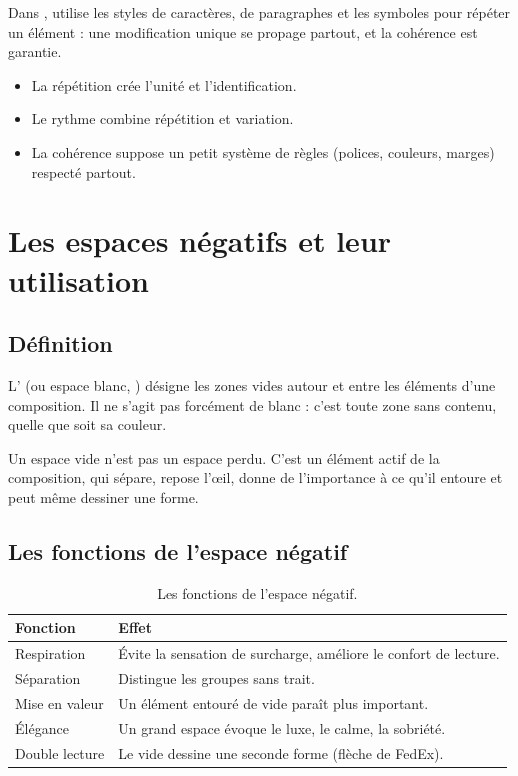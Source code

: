 \begin{astuce}
Dans , utilise les styles de caractères, de paragraphes et les symboles pour répéter un élément : une modification unique se propage partout, et la cohérence est garantie.
\end{astuce}

\begin{retenir}
\begin{itemize}
  \item La répétition crée l'unité et l'identification.
  \item Le rythme combine répétition et variation.
  \item La cohérence suppose un petit système de règles (polices, couleurs, marges) respecté partout.
\end{itemize}
\end{retenir}

\section{Les espaces négatifs et leur utilisation}

\subsection{Définition}

L' (ou espace blanc, ) désigne les zones vides autour et entre les éléments d'une composition. Il ne s'agit pas forcément de blanc : c'est toute zone sans contenu, quelle que soit sa couleur.

\begin{defbox}
Un espace vide n'est pas un espace perdu. C'est un élément actif de la composition, qui sépare, repose l'œil, donne de l'importance à ce qu'il entoure et peut même dessiner une forme.
\end{defbox}

\subsection{Les fonctions de l'espace négatif}

\begin{table}[h!]
\centering
\begin{tabular}{@{}p{3.5cm}p{10.5cm}@{}}
\toprule
\textbf{Fonction} & \textbf{Effet} \\
\midrule
Respiration & Évite la sensation de surcharge, améliore le confort de lecture. \\
Séparation & Distingue les groupes sans trait. \\
Mise en valeur & Un élément entouré de vide paraît plus important. \\
Élégance & Un grand espace évoque le luxe, le calme, la sobriété. \\
Double lecture & Le vide dessine une seconde forme (flèche de FedEx). \\
\bottomrule
\end{tabular}
\caption{Les fonctions de l'espace négatif.}
\end{table}

